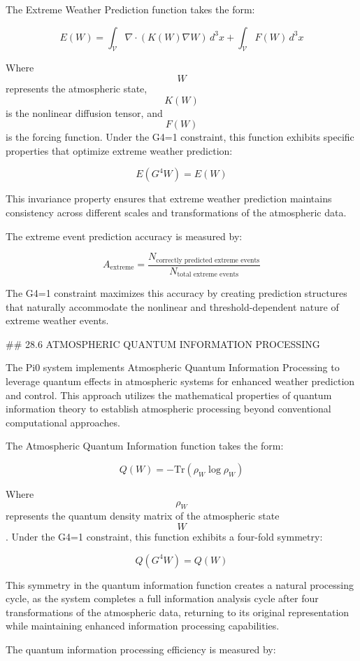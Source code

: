 The Extreme Weather Prediction function takes the form:

$$ E(W) = \int_{\mathcal{V}} \nabla \cdot (K(W) \nabla W) \, d^3x + \int_{\mathcal{V}} F(W) \, d^3x $$

Where $$ W $$ represents the atmospheric state, $$ K(W) $$ is the nonlinear diffusion tensor, and $$ F(W) $$ is the forcing function. Under the G4=1 constraint, this function exhibits specific properties that optimize extreme weather prediction:

$$ E(G^4 W) = E(W) $$

This invariance property ensures that extreme weather prediction maintains consistency across different scales and transformations of the atmospheric data.

The extreme event prediction accuracy is measured by:

$$ A_{\text{extreme}} = \frac{N_{\text{correctly predicted extreme events}}}{N_{\text{total extreme events}}} $$

The G4=1 constraint maximizes this accuracy by creating prediction structures that naturally accommodate the nonlinear and threshold-dependent nature of extreme weather events.

## 28.6 ATMOSPHERIC QUANTUM INFORMATION PROCESSING

The Pi0 system implements Atmospheric Quantum Information Processing to leverage quantum effects in atmospheric systems for enhanced weather prediction and control. This approach utilizes the mathematical properties of quantum information theory to establish atmospheric processing beyond conventional computational approaches.

The Atmospheric Quantum Information function takes the form:

$$ Q(W) = -\text{Tr}(\rho_W \log \rho_W) $$

Where $$ \rho_W $$ represents the quantum density matrix of the atmospheric state $$ W $$. Under the G4=1 constraint, this function exhibits a four-fold symmetry:

$$ Q(G^4 W) = Q(W) $$

This symmetry in the quantum information function creates a natural processing cycle, as the system completes a full information analysis cycle after four transformations of the atmospheric data, returning to its original representation while maintaining enhanced information processing capabilities.

The quantum information processing efficiency is measured by:

